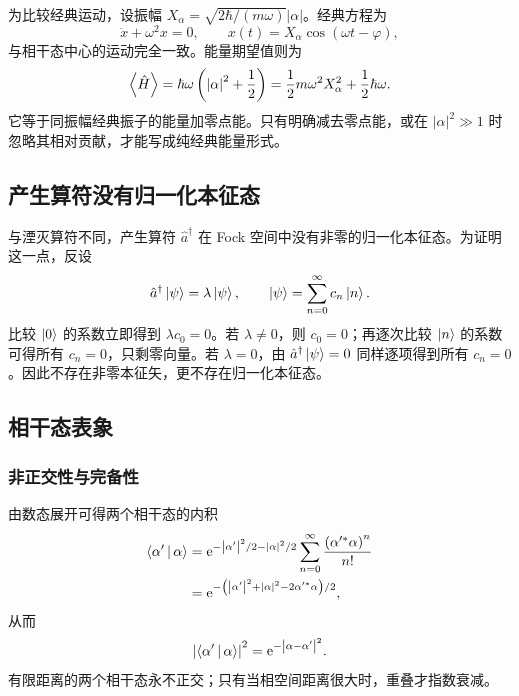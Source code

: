 为比较经典运动，设振幅
$X_\alpha=\sqrt{2\hbar/\left(m\omega\right)}\left|\alpha\right|$。经典方程为
\begin{equation}
\ddot x+\omega^2x=0,
\qquad x\left(t\right)=X_\alpha\cos\left(\omega t-\varphi\right),
\end{equation}
与相干态中心的运动完全一致。能量期望值则为
\begin{equation}
\Braket{\hat H}
=\hbar\omega\left(\left|\alpha\right|^2+\frac12\right)
=\frac12m\omega^2X_\alpha^2+\frac12\hbar\omega.
\end{equation}
它等于同振幅经典振子的能量加零点能。只有明确减去零点能，或在 $\left|\alpha\right|^2\gg1$ 时忽略其相对贡献，才能写成纯经典能量形式。

\subsection{产生算符没有归一化本征态}
与湮灭算符不同，产生算符 $\hat a^\dagger$ 在 Fock 空间中没有非零的归一化本征态。为证明这一点，反设
\begin{equation}
\hat a^\dagger\Ket{\psi}=\lambda\Ket{\psi},\qquad
\Ket{\psi}=\sum_{n=0}^{\infty}c_n\Ket{n}.
\end{equation}
比较 $\Ket{0}$ 的系数立即得到 $\lambda c_0=0$。若 $\lambda\neq0$，则 $c_0=0$；再逐次比较 $\Ket{n}$ 的系数可得所有 $c_n=0$，只剩零向量。若 $\lambda=0$，由
$\hat a^\dagger\Ket{\psi}=0$ 同样逐项得到所有 $c_n=0$。因此不存在非零本征矢，更不存在归一化本征态。

\subsection{相干态表象}
\subsubsection{非正交性与完备性}
由数态展开可得两个相干态的内积
\begin{align}
\Braket{\alpha'|\alpha}
&=\mathrm{e}^{-\left|\alpha'\right|^2/2-\left|\alpha\right|^2/2}
\sum_{n=0}^{\infty}\frac{\left(\alpha'^*\alpha\right)^n}{n!}\notag\\
&=\mathrm{e}^{-\left(\left|\alpha'\right|^2+\left|\alpha\right|^2-2\alpha'^*\alpha\right)/2},
\end{align}
从而
\begin{equation}
\left|\Braket{\alpha'|\alpha}\right|^2
=\mathrm{e}^{-\left|\alpha-\alpha'\right|^2}.
\end{equation}
有限距离的两个相干态永不正交；只有当相空间距离很大时，重叠才指数衰减。

